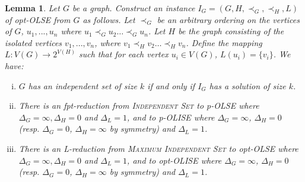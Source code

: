 \documentclass[11pt]{article}
\newtheorem{lemma}[theorem]{Lemma}
\begin{document}
\begin{lemma}
\label{lem:reduce-IS}
Let $G$ be a graph.  Construct an instance $I_G = (G, H, \prec_G, \prec_H, L)$ of opt-OLSE from $G$ as follows. Let $\prec_G$ be an arbitrary ordering on the vertices of $G$, ${u_1, ..., u_n}$ where $u_1 \prec_G u_2 \dots \prec_G u_n$.  Let $H$ be the graph consisting of the isolated vertices ${v_1, ..., v_n}$, where $v_1 \prec_H v_2 \dots \prec_H v_n$.  Define the mapping $L : V(G) \to 2^{V(H)}$ such that for each vertex $u_i \in V(G)$, $L(u_i) = \{v_i\}$. We have:
\begin{enumerate}[(i)]
  \item $G$ has an independent set of size $k$ if and only if $I_G$ has a solution of size $k$.
  \item There is an fpt-reduction from \textsc{Independent Set} to p-OLSE where $\Delta_G=\infty, \Delta_H=0$ and $\Delta_L=1$, and to p-OLISE where $\Delta_G=\infty$, $\Delta_H=0$ (resp. $\Delta_G=0$, $\Delta_H=\infty$ by symmetry) and $\Delta_L=1$.
  \item There is an L-reduction from \textsc{Maximum Independent Set} to opt-OLSE where $\Delta_G=\infty, \Delta_H=0$ and $\Delta_L=1$, and to opt-OLISE where $\Delta_G=\infty$, $\Delta_H=0$ (resp. $\Delta_G=0$, $\Delta_H=\infty$ by symmetry) and $\Delta_L=1$.
\end{enumerate}
\end{lemma}
\end{document}
